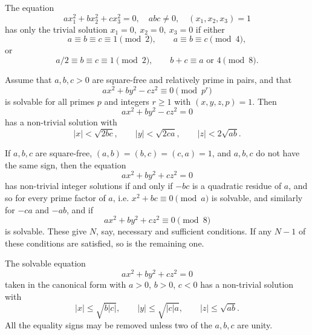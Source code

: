 \begin{proposition}
The equation
\[
    ax_1^2+bx_2^2+cx_3^2=0,\quad abc\ne0,\quad (x_1,x_2,x_3)=1
\]
has only the trivial solution $x_1=0,\ x_2=0,\ x_3=0$ if either
\[
    a\equiv b\equiv c\equiv1\pmod2,\qquad a\equiv b\equiv c\pmod4,
\]
or
\[
    a/2\equiv b\equiv c\equiv1\pmod2,\qquad b+c\equiv a\text{ or }4\pmod8.
\]
\end{proposition}

\begin{proposition}
Assume that $a,b,c>0$ are square-free and relatively prime in pairs, and that
\[
    ax^2+by^2-cz^2\equiv0\pmod{p^r}
\]
is solvable for all primes $p$ and integers $r\ge1$ with $(x,y,z,p)=1$. Then
\[
    ax^2+by^2-cz^2=0
\]
has a non-trivial solution with
\[
    |x|<\sqrt{2bc},\qquad |y|<\sqrt{2ca},\qquad |z|<2\sqrt{ab}.
\]
\end{proposition}

\begin{proposition}
If $a,b,c$ are square-free, $(a,b)=(b,c)=(c,a)=1$, and $a,b,c$ do not have
the same sign, then the equation
\[
    ax^2+by^2+cz^2=0
\]
has non-trivial integer solutions if and only if $-bc$ is a quadratic residue
of $a$, and so for every prime factor of $a$, i.e. $x^2+bc\equiv0\pmod a$ is
solvable, and similarly for $-ca$ and $-ab$, and if
\[
    ax^2+by^2+cz^2\equiv0\pmod8
\]
is solvable. These give $N$, say, necessary and sufficient conditions. If any
$N-1$ of these conditions are satisfied, so is the remaining one.
\end{proposition}

\begin{proposition}
The solvable equation
\[
    ax^2+by^2+cz^2=0
\]
taken in the canonical form with $a>0$, $b>0$, $c<0$ has a non-trivial solution
with
\[
    |x|\le\sqrt{b|c|},\qquad |y|\le\sqrt{|c|a},\qquad |z|\le\sqrt{ab}.
\]
All the equality signs may be removed unless two of the $a,b,c$ are unity.
\end{proposition}
